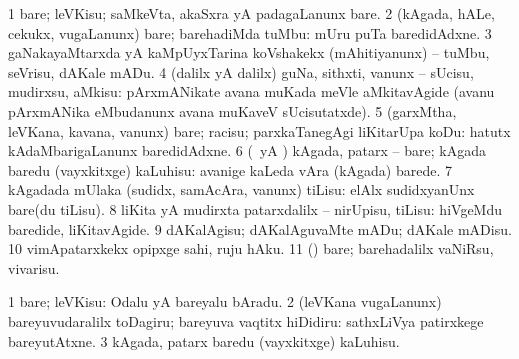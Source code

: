 \noindent
\gl{\sakirx}
\bmng
\bnum
\num{1} bare; leVKisu; saMkeVta, akaSxra yA padagaLanunx bare. 
\num{2} (kAgada, hALe, cekukx, \mo vugaLanunx) bare; barehadiMda tuMbu:  mUru puTa baredidAdxne. 
\num{3} gaNakayaMtarxda yA kaMpUyxTarina koVshakekx (mAhitiyanunx) -- tuMbu, seVrisu, dAKale mADu. 
\num{4} (\kaparx dalilx yA \BUkaq dalilx) guNa, sithxti, \mo vanunx -- sUcisu, mudirxsu, aMkisu:  pArxmANikate avana muKada meVle aMkitavAgide (avanu pArxmANika eMbudanunx avana muKaveV sUcisutatxde). 
\num{5} (garxMtha, leVKana, kavana, \mo vanunx) bare; racisu; parxkaTanegAgi liKitarUpa koDu:  hatutx kAdaMbarigaLanunx baredidAdxne. 
\num{6} (\ame\ yA \AmA) kAgada, patarx -- bare; kAgada baredu (vayxkitxge) kaLuhisu:  avanige kaLeda vAra (kAgada) barede. 
\num{7} kAgadada mUlaka (sudidx, samAcAra, \mo vanunx) tiLisu:  elAlx sudidxyanUnx bare(du tiLisu). 
\num{8} liKita yA mudirxta patarxdalilx -- nirUpisu, tiLisu:  hiVgeMdu baredide, liKitavAgide. 
\num{9} dAKalAgisu; dAKalAguvaMte mADu; dAKale mADisu. 
\num{10} vimApatarxkekx opipxge sahi, ruju hAku. 
\num{11} (\pArxparx) bare; barehadalilx vaNiRsu, vivarisu. 
\enum
\emng

\noindent
\gl{\akirx}
\expl{}
\bmng
\bnum
\num{1} bare; leVKisu:  Odalu yA bareyalu bAradu. 
\num{2} (leVKana \mo vugaLanunx) bareyuvudaralilx toDagiru; bareyuva vaqtitx hiDidiru:  sathxLiVya patirxkege bareyutAtxne. 
\num{3} kAgada, patarx baredu (vayxkitxge) kaLuhisu. 
\enum
\emng

